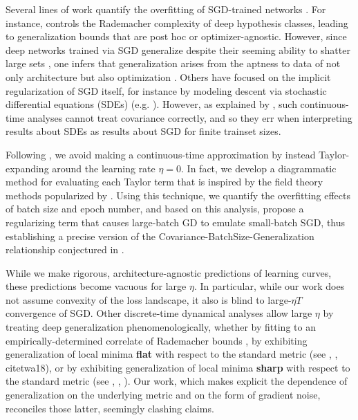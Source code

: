 \documentclass{article}
\begin{document}
    Several lines of work quantify the overfitting of SGD-trained networks
    \citep{ne17a}.  For instance, \citet{ba17} controls the Rademacher
    complexity of deep hypothesis classes, leading to generalization bounds
    that are post hoc or optimizer-agnostic.  However, since deep networks
    trained via SGD generalize despite their seeming ability to shatter large
    sets \citep{zh17}, one infers that generalization arises from the aptness
    to data of not only architecture but also optimization \citep{ne17b}.
    Others have focused on the implicit regularization of SGD itself, for
    instance by modeling descent via stochastic differential equations (SDEs)
    (e.g.  \citet{ch18}).  However, as explained by \citet{ya19}, such
    continuous-time analyses cannot treat covariance correctly, and so they err
    when interpreting results about SDEs as results about SGD for finite
    trainset sizes.

    Following \citet{ro18}, we avoid making a continuous-time approximation by
    instead Taylor-expanding around the learning rate $\eta=0$.  In fact, we
    develop a diagrammatic method for evaluating each Taylor term that is
    inspired by the field theory methods popularized by \citet{dy49a}.  Using
    this technique, we quantify the overfitting effects of batch size and epoch
    number, and based on this analysis, propose a regularizing term that causes
    large-batch GD to emulate small-batch SGD, thus establishing a precise
    version of the Covariance-BatchSize-Generalization relationship conjectured
    in \citet{ja18}.  
    
    While we make rigorous, architecture-agnostic predictions of learning
    curves, these predictions become vacuous for large $\eta$.  In particular,
    while our work does not assume convexity of the loss landscape, it also is
    blind to large-$\eta T$ convergence of SGD.  Other discrete-time dynamical
    analyses allow large $\eta$ by treating deep generalization
    phenomenologically, whether by fitting to an empirically-determined
    correlate of Rademacher bounds \citep{li18}, by exhibiting generalization
    of local minima {\bf flat} with respect to the standard metric (see
    \citet{ho17}, \citet{ke17}, citet{wa18}), or by exhibiting generalization
    of local minima {\bf sharp} with respect to the standard metric (see
    \citet{st56}, \citet{di17}, \citet{wu18}).  Our work, which makes explicit
    the dependence of generalization on the underlying metric and on the form
    of gradient noise, reconciles those latter, seemingly clashing claims.
    
\end{document}
